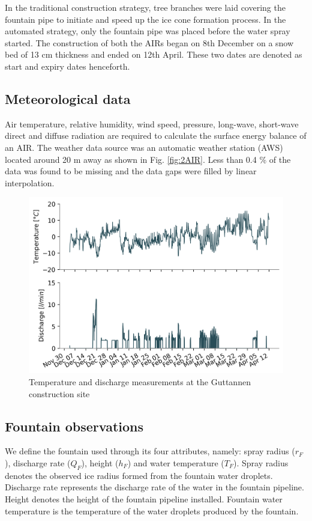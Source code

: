 \documentclass[tc, manuscript]{copernicus}
\begin{document}
In the traditional construction strategy, tree branches were laid covering the fountain pipe to initiate and
speed up the ice cone formation process. In the automated strategy, only the fountain pipe was placed before the
water spray started. The construction of both the AIRs began on 8th December on a snow bed of 13 cm thickness
and ended on 12th April. These two dates are denoted as start and expiry dates henceforth.

\subsection{Meteorological data}

Air temperature, relative humidity, wind speed, pressure, long-wave, short-wave direct and diffuse radiation are
required to calculate the surface energy balance of an AIR.  The weather data source was an automatic weather
station (AWS) located around 20 m away as shown in Fig. \ref{fig:2AIR}. Less than 0.4 \% of the data was found
to be missing and the data gaps were filled by linear interpolation. 

\begin{figure}[t]
\includegraphics[width=12cm]{Figures/disvstemp.png}
\caption{Temperature and discharge measurements at the Guttannen construction site}
\label{fig:aws} 
\end{figure}


\subsection{Fountain observations}

We define the fountain used through its four attributes, namely: spray radius ($r_F$), discharge rate ($Q_F$),
height ($h_F$) and water temperature ($T_F$). Spray radius denotes the observed ice radius formed from the
fountain water droplets. Discharge rate represents the discharge rate of the water in the fountain pipeline.
Height denotes the height of the fountain pipeline installed. Fountain water temperature is the temperature of
the water droplets produced by the fountain.
\end{document}

